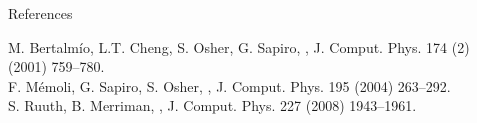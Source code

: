 \documentclass{beamer}
\begin{document}
\begin{frame}{References}
\begin{thebibliography}{10}

 M. Bertalm\'io, L.T. Cheng, S. Osher, G. Sapiro, 
, 
\newblock J. Comput. Phys. 174 (2) (2001) 759--780.\\

 F. M\'emoli, G. Sapiro, S. Osher,
, 
\newblock J. Comput. Phys. 195 (2004) 263--292.\\

 S. Ruuth, B. Merriman,
, 
\newblock J. Comput. Phys. 227 (2008) 1943--1961.\\

\end{thebibliography}
\end{frame}
\end{document}
